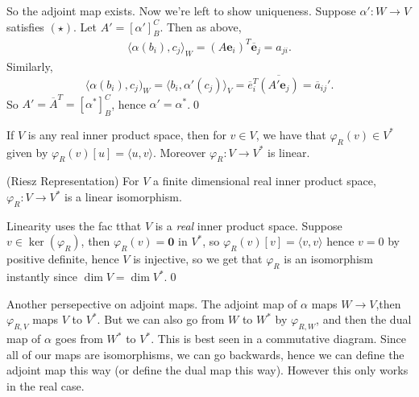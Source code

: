 \documentclass{article}
\begin{document}
So the adjoint map exists. Now we're left to show uniqueness. Suppose $ \alpha':W\to V $ satisfies $ (\star) $. Let $ A'=[\alpha']^C_B $. Then as above,
\begin{align*}
	\langle \alpha(b_i),c_j\rangle_W=(A\mathbf e_i)^T\overline{\mathbf e}_j=a_{ji}.
\end{align*}
Similarly,
\[
\langle \alpha(b_i),c_j)_W=\langle b_i,\alpha'(c_j)\rangle_V=\overline e^T_i\overline{(A'\mathbf e_j)}=\overline{a}_{ij}'.
\]
So $ A'=\overline A^T=[\alpha^*]_B^C $, hence $ \alpha'=\alpha^* $.\qed
\par
If $ V $ is any real inner product space, then for $ v\in V $, we have that $ \varphi_R(v)\in V^* $  given by $ \varphi_R(v)[u]=\langle u,v\rangle $. Moreover $ \varphi_R:V\to V^* $ is linear.
\begin{theorem}
	(Riesz Representation) For $ V $ a finite dimensional real inner product space, $ \varphi_R:V\to V^* $ is a linear isomorphism.
\end{theorem}
\pf Linearity uses the fac tthat $ V $ is a \textit{real} inner product space. Suppose $ v\in \ker(\varphi_R) $, then $ \varphi_R(v)=\mathbf 0 $ in $ V^* $, so $ \varphi_R(v)[v]=\langle v,v\rangle $ hence $ v=0 $ by positive definite, hence $ V $ is injective, so we get that $ \varphi_R $ is an isomorphism instantly since $ \dim V=\dim V^* $.\qed
\begin{remark}
	Another persepective on adjoint maps. The adjoint map of $ \alpha $ maps $ W\to V $,then $ \varphi_{R,V} $ maps $ V $ to $ V^* $. But we can also go from $ W $ to $ W^* $ by $ \varphi_{R,W} $, and then the dual map of $ \alpha $ goes from $ W^* $ to $ V^* $. This is best seen in a commutative diagram. Since all of our maps are isomorphisms, we can go backwards, hence we can define the adjoint map this way (or define the dual map this way). However this only works in the real case.
\end{remark}
\end{document}
